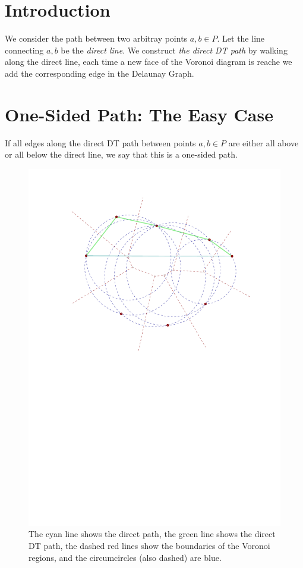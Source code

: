 \documentclass{tufte-handout}
\begin{document}
\section{Introduction}

We consider the path between two arbitray points $a,b \in P$.  Let the
line connecting $a,b$ be the \emph{direct line}.  We construct
\emph{the direct DT path} by walking along the direct line, each time
a new face of the Voronoi diagram is reache we add the corresponding
edge in the Delaunay Graph.

\section{One-Sided Path: The Easy Case}

If all edges along the direct DT path between points $a,b \in P$ are
either all above or all below the direct line, we say that this is a
one-sided path.

\begin{figure}
  \includegraphics[scale=1.0]{figures/one-sided_path.pdf}
  \caption{The cyan line shows the direct path, the green line shows
    the direct DT path, the dashed red lines show the boundaries of
    the Voronoi regions, and the circumcircles (also dashed) are
    blue.}
\end{figure}
\end{document}
